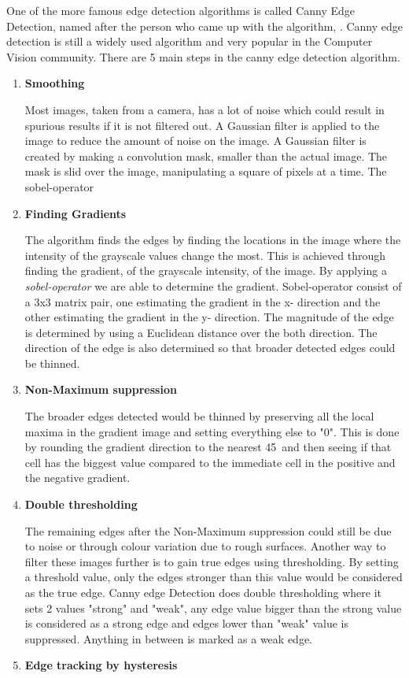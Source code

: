 One of the more famous edge detection algorithms is called Canny Edge Detection\cite{canny-paper}, named after the person who came up with the algorithm, \citeauthor{canny-paper}. Canny edge detection is still a widely used algorithm and very popular in the Computer Vision community. There are 5 main steps in the canny edge detection algorithm\cite{canny-tutorial}.
\begin{enumerate}
\item \textbf{Smoothing}

Most images, taken from a camera, has a lot of noise which could result in spurious results if it is not filtered out. A Gaussian filter is applied to the image to reduce the amount of noise on the image. A Gaussian filter is created by making a convolution mask, smaller than the actual image. The mask is slid over the image, manipulating a square of pixels at a time\cite{canny-tutorial2}. The sobel-operator
\item \textbf{Finding Gradients}

The algorithm finds the edges by finding the locations in the image where the intensity of the grayscale values change the most. This is achieved through finding the gradient, of the grayscale intensity, of the image. By applying a \emph{sobel-operator} we are able to determine the gradient\cite{sobel-operator}. Sobel-operator consist of a 3x3 matrix pair, one estimating the gradient in the x- direction and the other estimating the gradient in the y- direction. The magnitude of the edge is determined by using a Euclidean distance over the both direction. The direction of the edge is also determined so that broader detected edges could be thinned.
\item \textbf{Non-Maximum suppression}

The broader edges detected would be thinned by preserving all the local maxima in the gradient image and setting everything else to "0". This is done by rounding the gradient direction to the nearest 45\textdegree \,  and then seeing if that cell has the biggest value compared to the immediate cell in the positive and the negative gradient. 
\item \textbf{Double thresholding}

The remaining edges after the Non-Maximum suppression could still be due to noise or through colour variation due to rough surfaces. Another way to filter these images further is to gain true edges using thresholding. By setting a threshold value, only the edges stronger than this value would be considered as the true edge. Canny edge Detection does double thresholding where it sets 2 values "strong" and "weak", any edge value bigger than the strong value is considered as a strong edge and edges lower than "weak"  value is suppressed. Anything in between is marked as a weak edge.
\item \textbf{Edge tracking by hysteresis}


\end{enumerate}
